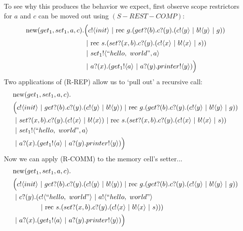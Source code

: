 	To see why this produces the behavior we expect, first observe scope restrictors for $a$ and $c$ can be moved out using $(S-REST-COMP)$:
	\begin{equation}\begin{split}
		\text{new}({get_1,set_1,a,c}). & \Big({c}!\langle{init}\rangle \ |\ \text{rec }{g}.({get}?({b}).{c}?({y}).({c}!\langle{y}\rangle\ |\  {b}!\langle{y}\rangle\ |\  g))\\
			&\ |\ \text{rec }{s}.({set}?({x,b}).{c}?({y}).({c}!\langle{x}\rangle\ |\ {b}!\langle{x}\rangle\ |\  s))\\
		&\ |\  {set_1}!\langle{``hello,\ world",a}\rangle\\
		&\ |\  {a}?({x}).({get_1}!\langle{a}\rangle\ |\  {a}?({y}).{printer}!\langle{y}\rangle)\Big)
	\end{split}\end{equation}
	Two applications of (R-REP) allow us to `pull out' a recursive call:
	\begin{equation}\begin{split}
		&\text{new}({get_1,set_1,a,c}).\\
		&\Big({c}!\langle{init}\rangle \ |\ {get}?({b}).{c}?({y}).({c}!\langle{y}\rangle\ |\  {b}!\langle{y}\rangle)\ |\  \text{rec }{g}.({get}?({b}).{c}?({y}).({c}!\langle{y}\rangle\ |\  {b}!\langle{y}\rangle\ |\  g))\\
			&\ |\  {set}?({x,b}).{c}?({y}).({c}!\langle{x}\rangle\ |\ {b}!\langle{x}\rangle)\ |\  \text{rec }{s}.({set}?({x,b}).{c}?({y}).({c}!\langle{x}\rangle\ |\ {b}!\langle{x}\rangle\ |\  s))\\
		&\ |\  {set_1}!\langle{``hello,\ world",a}\rangle\\
		&\ |\  {a}?({x}).({get_1}!\langle{a}\rangle\ |\  {a}?({y}).{printer}!\langle{y}\rangle)\Big)
	\end{split}\end{equation}
	Now we can apply (R-COMM) to the memory cell's setter...
	\begin{equation}\begin{split}
		&\new{get_1,set_1,a,c}\\
		&\Big(\send{c}{init} \comp\receive{get}{b}\receive{c}{y}(\send{c}{y}\comp \send{b}{y})\comp \rec{g}(\receive{get}{b}\receive{c}{y}(\send{c}{y}\comp \send{b}{y}\comp g))\\
			&\begin{split}\comp \receive{c}{y}(&\send{c}{``hello,\ world"}\comp\send{a}{``hello,\ world"} \\
			&\comp \rec{s}(\receive{set}{x,b}\receive{c}{y}(\send{c}{x}\comp\send{b}{x}\comp s)))\end{split}\\
		&\comp \receive{a}{x}(\send{get_1}{a}\comp \receive{a}{y}\send{printer}{y})\Big)
	\end{split}\end{equation}
